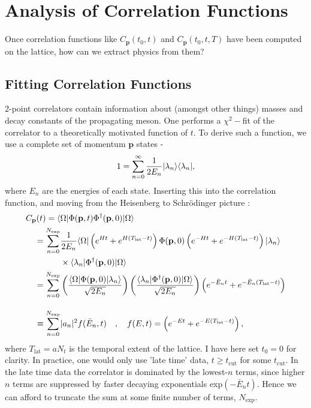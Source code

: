 \section{Analysis of Correlation Functions}

Once correlation functions like $C_{\textbf{p}}(t_0,t)$ and $C_{\textbf{p}}(t_0,t,T)$ have been computed on the lattice, how can we extract physics from them?

\subsection{Fitting Correlation Functions}
\label{sec:correlator_fits}

2-point correlators contain information about (amongst other things) masses and decay constants of the propagating meson. One performs a $\chi^2-$fit of the correlator to a theoretically motivated function of $t$. To derive such a function, we use a complete set of momentum ${\textbf{p}}$ states -
\begin{align}
  1 = \sum_{n=0}^{\infty} {1\over 2E_n} | \lambda_n \rangle \langle \lambda_n |,
\end{align}
where $E_n$ are the energies of each state. Inserting this into the correlation function, and moving from the Heisenberg to Schr\"odinger picture \cite{Weber:2013eba}:
\begin{align}
  C_{\textbf{p}}(t) = \langle& \Omega | \Phi({\textbf{p}},t) \Phi^{\dagger}({\textbf{p}},0)|\Omega\rangle \nonumber \\
  =\sum_{n=0}^{N_{\text{exp}}} & {1\over 2E_n} \langle \Omega | \left( e^{Ht} + e^{H(T_{\text{lat}}-t)} \right)  \Phi({\textbf{p}},0) \left( e^{-Ht} + e^{-H(T_{\text{lat}}-t)} \right) | \lambda_n \rangle
  \nonumber
  \\
  &\times \langle \lambda_n | \Phi^{\dagger}({\textbf{p}},0) | \Omega \rangle
  \nonumber
  \\  = \sum_{n=0}^{N_{\text{exp}}} & \left( {\langle \Omega | \Phi({\textbf{p}},0) | \lambda_n \rangle \over \sqrt{2E_n}} \right) \left( {\langle \lambda_n | \Phi^{\dagger}({\textbf{p}},0) | \Omega \rangle \over \sqrt{2E_n} } \right) \left( e^{-\bar{E}_n t} + e^{-\bar{E}_n (T_{\text{lat}}-t)} \right)
  \nonumber
  \\[10pt] \equiv \sum_{n=0}^{N_{\text{exp}}} & |a_n|^2 f(\bar{E}_n,t) \quad,\quad f(E,t) = \left( e^{-E t} + e^{-E(T_{\text{lat}}-t)} \right),
  \label{eq:multiexponential}
\end{align}
where $T_{\text{lat}}=aN_t$ is the temporal extent of the lattice. I have here set $t_0=0$ for clarity. In practice, one would only use 'late time' data,  $t\geq t_{\text{cut}}$ for some $t_{\text{cut}}$. In the late time data the correlator is dominated by the lowest-$n$ terms, since higher $n$ terms are suppressed by faster decaying exponentials exp$(-\bar{E}_nt)$. Hence we can afford to truncate the sum at some finite number of terms, $N_{\text{exp}}$. 

